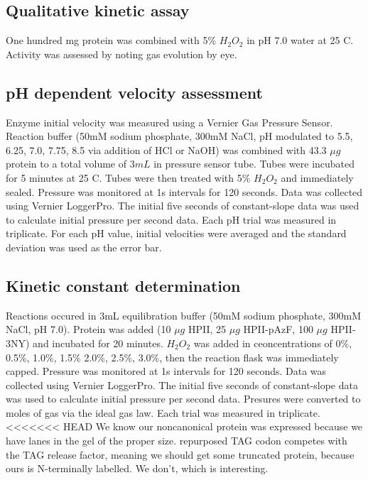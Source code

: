 \documentclass[9pt,twocolumn,twoside]{pnas-new}
\begin{document}
{\subsection*{Qualitative kinetic assay}
One hundred mg protein was combined with 5\% $H_2O_2$ in pH 7.0 water at 25 \degree C. Activity was assessed by noting gas evolution by eye.\\

\subsection*{pH dependent velocity assessment}
Enzyme initial velocity was measured using a Vernier Gas Pressure Sensor. Reaction buffer (50mM sodium phosphate, 300mM NaCl, pH modulated to 5.5, 6.25, 7.0, 7.75, 8.5 via addition of HCl or NaOH) was combined with 43.3 $\mu g$ protein to a total volume of $3mL$ in pressure sensor tube. Tubes were incubated for 5 minutes at 25 \degree C. Tubes were then treated with 5\% $H_2O_2$ and immediately sealed. Pressure was monitored at 1s intervals for 120 seconds. Data was collected using Vernier LoggerPro. The initial five seconds of constant-slope data was used to calculate initial pressure per second data. Each pH trial was measured in triplicate. For each pH value, initial velocities were averaged and the standard deviation was used as the error bar.\\

\subsection*{Kinetic constant determination}
Reactions occured in 3mL equilibration buffer (50mM sodium phosphate, 300mM NaCl, pH 7.0). Protein was added (10 $\mu g$ HPII, 25 $\mu g$ HPII-pAzF, 100 $\mu g$ HPII-3NY) and incubated for 20 minutes. $H_2O_2$ was added in ceoncentrations of 0\%, 0.5\%, 1.0\%, 1.5\% 2.0\%, 2.5\%, 3.0\%, then the reaction flask was immediately capped. Pressure was monitored at 1s intervals for 120 seconds. Data was collected using Vernier LoggerPro. The initial five seconds of constant-slope data was used to calculate initial pressure per second data. Presures were converted to moles of gas via the ideal gas law. Each trial was measured in triplicate.\\

<<<<<<< HEAD
We know our noncanonical protein was expressed because we have lanes in the gel of the proper size. repurposed TAG codon competes with the TAG release factor, meaning we should get some truncated protein, because ours is N-terminally labelled. We don't, which is interesting.

}
\end{document}
